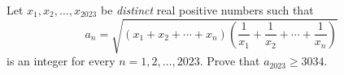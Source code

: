 Let $x_1, x_2, \ldots, x_{2023}$ be \emph{distinct} real positive numbers such that
\[
a_n = \sqrt{(x_1 + x_2 + \cdots + x_n)\left(\frac{1}{x_1} + \frac{1}{x_2} + \cdots + \frac{1}{x_n}\right)}
\]
is an integer for every $n = 1, 2, \ldots, 2023$. Prove that $a_{2023} \geq 3034$.
